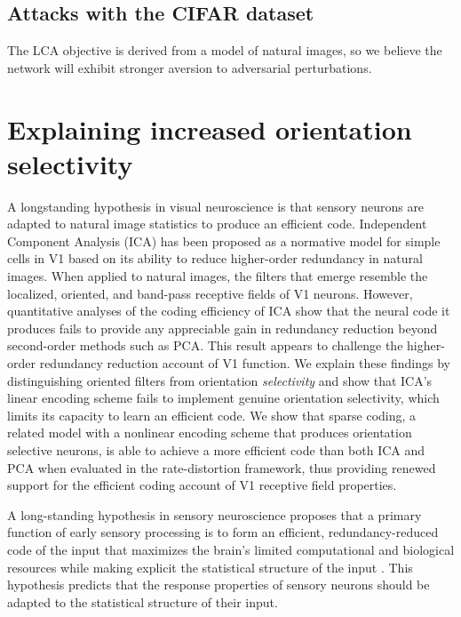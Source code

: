 \subsection{Attacks with the CIFAR dataset}
The LCA objective is derived from a model of natural images, so we believe the network will exhibit stronger aversion to adversarial perturbations.

\section{Explaining increased orientation selectivity}
A longstanding hypothesis in visual neuroscience is that sensory neurons are adapted to natural image statistics to produce an efficient code. Independent Component Analysis (ICA) has been proposed as a normative model for simple cells in V1 based on its ability to reduce higher-order redundancy in natural images. When applied to natural images, the filters that emerge resemble the localized, oriented, and band-pass receptive fields of V1 neurons. However, quantitative analyses of the coding efficiency of ICA show that the neural code it produces fails to provide any appreciable gain in redundancy reduction beyond second-order methods such as PCA. This result appears to challenge the higher-order redundancy reduction account of V1 function. We explain these findings by distinguishing oriented filters from orientation \textit{selectivity} and show that ICA's linear encoding scheme fails to implement genuine orientation selectivity, which limits its capacity to learn an efficient code. We show that sparse coding, a related model with a nonlinear encoding scheme that produces orientation selective neurons, is able to achieve a more efficient code than both ICA and PCA when evaluated in the rate-distortion framework, thus providing renewed support for the efficient coding account of V1 receptive field properties.

A long-standing hypothesis in sensory neuroscience proposes that a primary function of early sensory processing is to form an efficient, redundancy-reduced code of the input that maximizes the brain's limited computational and biological resources while making explicit the statistical structure of the input \cite{barlow2001redundancy}. This hypothesis predicts that the response properties of sensory neurons should be adapted to the statistical structure of their input.

